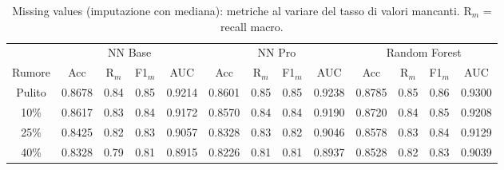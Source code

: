 \begin{table}[H]\centering\footnotesize
\setlength{\tabcolsep}{4pt}
\caption{Missing values (imputazione con mediana): metriche al variare del tasso di valori mancanti. R$_m$ = recall macro.}\label{tab:mv}
\begin{tabular}{c *{12}{c}}
\toprule
 & \multicolumn{4}{c}{NN Base} & \multicolumn{4}{c}{NN Pro} & \multicolumn{4}{c}{Random Forest}\\
\cmidrule(lr){2-5}\cmidrule(lr){6-9}\cmidrule(lr){10-13}
Rumore & Acc & R$_m$ & F1$_m$ & AUC & Acc & R$_m$ & F1$_m$ & AUC & Acc & R$_m$ & F1$_m$ & AUC \\
\midrule
Pulito & 0.8678 & 0.84 & 0.85 & 0.9214 & 0.8601 & 0.85 & 0.85 & 0.9238 & 0.8785 & 0.85 & 0.86 & 0.9300 \\
10\% & 0.8617 & 0.83 & 0.84 & 0.9172 & 0.8570 & 0.84 & 0.84 & 0.9190 & 0.8720 & 0.84 & 0.85 & 0.9208 \\
25\% & 0.8425 & 0.82 & 0.83 & 0.9057 & 0.8328 & 0.83 & 0.82 & 0.9046 & 0.8578 & 0.83 & 0.84 & 0.9129 \\
40\% & 0.8328 & 0.79 & 0.81 & 0.8915 & 0.8226 & 0.81 & 0.81 & 0.8937 & 0.8528 & 0.82 & 0.83 & 0.9039 \\
\bottomrule
\end{tabular}
\end{table}
